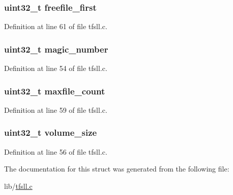 \subsubsection[{freefile\+\_\+first}]{\setlength{\rightskip}{0pt plus 5cm}uint32\+\_\+t freefile\+\_\+first}\label{structtfs__description_a3d4253341d8bca005cbe655683b7ffb2}


Definition at line 61 of file tfsll.\+c.

\hypertarget{structtfs__description_a45eaf7e07ea0226c1328ee7d4a5f7948}{}
\subsubsection[{magic\+\_\+number}]{\setlength{\rightskip}{0pt plus 5cm}uint32\+\_\+t magic\+\_\+number}\label{structtfs__description_a45eaf7e07ea0226c1328ee7d4a5f7948}


Definition at line 54 of file tfsll.\+c.

\hypertarget{structtfs__description_a6f1ffc34987098c5c1695bf4e99475cf}{}
\subsubsection[{maxfile\+\_\+count}]{\setlength{\rightskip}{0pt plus 5cm}uint32\+\_\+t maxfile\+\_\+count}\label{structtfs__description_a6f1ffc34987098c5c1695bf4e99475cf}


Definition at line 59 of file tfsll.\+c.

\hypertarget{structtfs__description_a3c0f4e18beea4efdae616c390877c597}{}
\subsubsection[{volume\+\_\+size}]{\setlength{\rightskip}{0pt plus 5cm}uint32\+\_\+t volume\+\_\+size}\label{structtfs__description_a3c0f4e18beea4efdae616c390877c597}


Definition at line 56 of file tfsll.\+c.



The documentation for this struct was generated from the following file\+:\begin{DoxyCompactItemize}
\item 
lib/\hyperlink{tfsll_8c}{tfsll.\+c}\end{DoxyCompactItemize}
